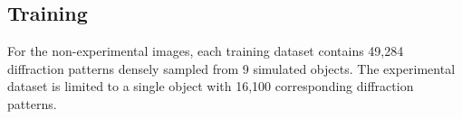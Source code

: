 \documentclass[sn-mathphys]{sn-jnl}%
\theoremstyle{thmstyleone}%
\theoremstyle{thmstyletwo}%
\theoremstyle{thmstylethree}%
\begin{document}



\subsection{Training}
For the non-experimental images, each training dataset contains 49,284 diffraction patterns densely sampled from 9 simulated objects. The experimental dataset is limited to a single object with 16,100 corresponding diffraction patterns. 
\end{document}
